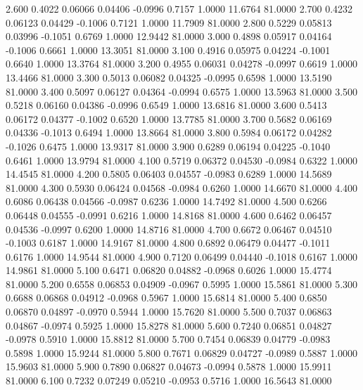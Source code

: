    2.600   0.4022   0.06066   0.04406  -0.0996   0.7157   1.0000  11.6764  81.0000
   2.700   0.4232   0.06123   0.04429  -0.1006   0.7121   1.0000  11.7909  81.0000
   2.800   0.5229   0.05813   0.03996  -0.1051   0.6769   1.0000  12.9442  81.0000
   3.000   0.4898   0.05917   0.04164  -0.1006   0.6661   1.0000  13.3051  81.0000
   3.100   0.4916   0.05975   0.04224  -0.1001   0.6640   1.0000  13.3764  81.0000
   3.200   0.4955   0.06031   0.04278  -0.0997   0.6619   1.0000  13.4466  81.0000
   3.300   0.5013   0.06082   0.04325  -0.0995   0.6598   1.0000  13.5190  81.0000
   3.400   0.5097   0.06127   0.04364  -0.0994   0.6575   1.0000  13.5963  81.0000
   3.500   0.5218   0.06160   0.04386  -0.0996   0.6549   1.0000  13.6816  81.0000
   3.600   0.5413   0.06172   0.04377  -0.1002   0.6520   1.0000  13.7785  81.0000
   3.700   0.5682   0.06169   0.04336  -0.1013   0.6494   1.0000  13.8664  81.0000
   3.800   0.5984   0.06172   0.04282  -0.1026   0.6475   1.0000  13.9317  81.0000
   3.900   0.6289   0.06194   0.04225  -0.1040   0.6461   1.0000  13.9794  81.0000
   4.100   0.5719   0.06372   0.04530  -0.0984   0.6322   1.0000  14.4545  81.0000
   4.200   0.5805   0.06403   0.04557  -0.0983   0.6289   1.0000  14.5689  81.0000
   4.300   0.5930   0.06424   0.04568  -0.0984   0.6260   1.0000  14.6670  81.0000
   4.400   0.6086   0.06438   0.04566  -0.0987   0.6236   1.0000  14.7492  81.0000
   4.500   0.6266   0.06448   0.04555  -0.0991   0.6216   1.0000  14.8168  81.0000
   4.600   0.6462   0.06457   0.04536  -0.0997   0.6200   1.0000  14.8716  81.0000
   4.700   0.6672   0.06467   0.04510  -0.1003   0.6187   1.0000  14.9167  81.0000
   4.800   0.6892   0.06479   0.04477  -0.1011   0.6176   1.0000  14.9544  81.0000
   4.900   0.7120   0.06499   0.04440  -0.1018   0.6167   1.0000  14.9861  81.0000
   5.100   0.6471   0.06820   0.04882  -0.0968   0.6026   1.0000  15.4774  81.0000
   5.200   0.6558   0.06853   0.04909  -0.0967   0.5995   1.0000  15.5861  81.0000
   5.300   0.6688   0.06868   0.04912  -0.0968   0.5967   1.0000  15.6814  81.0000
   5.400   0.6850   0.06870   0.04897  -0.0970   0.5944   1.0000  15.7620  81.0000
   5.500   0.7037   0.06863   0.04867  -0.0974   0.5925   1.0000  15.8278  81.0000
   5.600   0.7240   0.06851   0.04827  -0.0978   0.5910   1.0000  15.8812  81.0000
   5.700   0.7454   0.06839   0.04779  -0.0983   0.5898   1.0000  15.9244  81.0000
   5.800   0.7671   0.06829   0.04727  -0.0989   0.5887   1.0000  15.9603  81.0000
   5.900   0.7890   0.06827   0.04673  -0.0994   0.5878   1.0000  15.9911  81.0000
   6.100   0.7232   0.07249   0.05210  -0.0953   0.5716   1.0000  16.5643  81.0000
